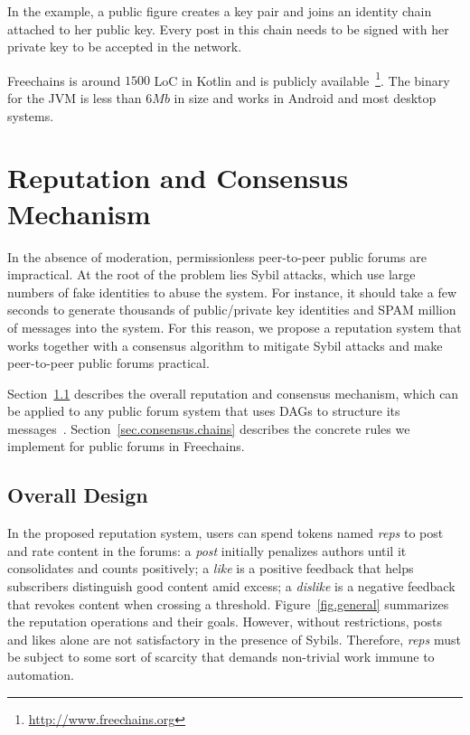 \documentclass[10pt,journal,compsoc]{IEEEtran}
\newcommand{\FC}       {Freechains\xspace}
\newcommand{\reps}     {\emph{reps}\xspace}
\begin{document}
In the example, a public figure creates a key pair and joins an identity chain
attached to her public key.
Every post in this chain needs to be signed with her private key to be accepted
in the network.

\FC is around $1500$ LoC in Kotlin and is publicly
available~\footnote{\url{http://www.freechains.org}}.
The binary for the JVM is less than $6Mb$ in size and works in Android and most
desktop systems.

\section{Reputation and Consensus Mechanism}
\label{sec.consensus}

In the absence of moderation, permissionless peer-to-peer public forums are
impractical.
At the root of the problem lies Sybil attacks, which use large numbers of fake
identities to abuse the system.
For instance, it should take a few seconds to generate thousands of
public/private key identities and SPAM million of messages into the system.
For this reason, we propose a reputation system that works together with a
consensus algorithm to mitigate Sybil attacks and make peer-to-peer public
forums practical.

Section~\ref{sec.consensus.design} describes the overall reputation and
consensus mechanism, which can be applied to any public forum system that uses
DAGs to structure its messages~\cite{TODO.33,TODO.34,p2p.merkle-crdts}.
Section~\ref{sec.consensus.chains} describes the concrete rules we implement
for public forums in \FC.

\subsection{Overall Design}
\label{sec.consensus.design}

In the proposed reputation system, users can spend tokens named \reps to post
and rate content in the forums:
a \emph{post} initially penalizes authors until it consolidates and counts
positively;
a \emph{like} is a positive feedback that helps subscribers distinguish good
content amid excess;
a \emph{dislike} is a negative feedback that revokes content when crossing a
threshold.
Figure~\ref{fig.general} summarizes the reputation operations and their goals.
%
However, without restrictions, posts and likes alone are not satisfactory in
the presence of Sybils.
Therefore, \reps must be subject to some sort of scarcity that demands
non-trivial work immune to automation.
\end{document}
